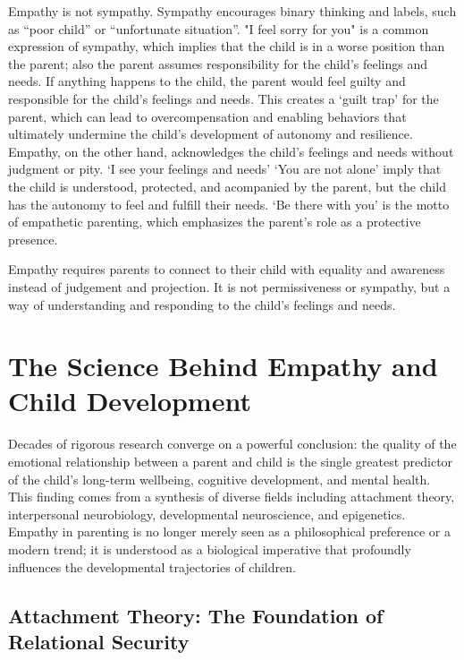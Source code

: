 Empathy is not sympathy.
Sympathy encourages binary thinking and labels, such as ``poor child'' or ``unfortunate situation''.
"I feel sorry for you" is a common expression of sympathy, which implies that the child is in a worse position than the parent; also the parent assumes responsibility for the child's feelings and needs.
If anything happens to the child, the parent would feel guilty and responsible for the child's feelings and needs.
This creates a `guilt trap' for the parent, which can lead to overcompensation and enabling behaviors that ultimately undermine the child's development of autonomy and resilience.
Empathy, on the other hand, acknowledges the child's feelings and needs without judgment or pity.
`I see your feelings and needs' `You are not alone' imply that the child is understood, protected, and acompanied by the parent, but the child has the autonomy to feel and fulfill their needs.
`Be there with you' is the motto of empathetic parenting, which emphasizes the parent's role as a protective presence.

\begin{keyinsight}
Empathy requires parents to connect to their child with equality and awareness instead of judgement and projection. 
It is not permissiveness or sympathy, but a way of understanding and responding to the child's feelings and needs.
\end{keyinsight}

\section{The Science Behind Empathy and Child Development}

Decades of rigorous research converge on a powerful conclusion: the quality of the
emotional relationship between a parent and child is the single greatest 
predictor of the child's long-term wellbeing, cognitive development, and mental health.
This finding comes from a synthesis of diverse fields including attachment theory,
interpersonal neurobiology, developmental neuroscience, and epigenetics. 
Empathy in parenting is no longer merely seen as a philosophical preference or a modern trend; it is understood as a biological imperative that profoundly influences the developmental trajectories of children.

\subsection{Attachment Theory: The Foundation of Relational Security}

